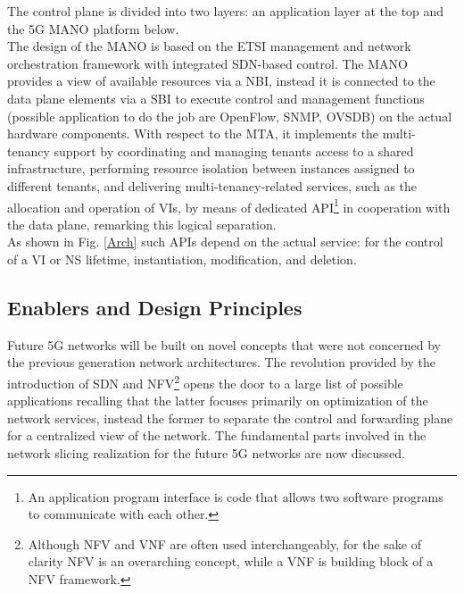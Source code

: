 \documentclass[a4paper,12pt]{report} %
\begin{document}
The control plane is divided into two layers: an application layer at the top and the 5G \gls{MANO} platform below. \\
The design of the MANO is based on the ETSI management and network orchestration framework with integrated SDN-based control. The MANO
provides a view of available resources  via a \gls{NBI}, instead it is connected to the data plane
elements via a \gls{SBI} to execute control and management
functions (possible application to do the job are OpenFlow, SNMP, OVSDB) on the actual hardware components.
With respect to the \gls{MTA}, it implements the
multi-tenancy support by coordinating and managing tenants access to a shared
infrastructure, performing resource isolation between instances assigned to
different tenants, and delivering multi-tenancy-related services, such as the
allocation and operation of VIs, by means of dedicated \gls{API}\footnote{An application program interface is code that allows two software programs to communicate with each other.} in cooperation
with the data plane, remarking this logical separation. \\
As shown in Fig. \ref{Arch}
such APIs depend on the actual service: for the control of a VI or NS lifetime,
instantiation, modification, and deletion.

\subsection{Enablers and Design Principles}
Future 5G networks will be built on novel concepts that were not concerned by the previous generation
network architectures. The revolution provided by the introduction of SDN
and \gls{NFV}\footnote{Although NFV and VNF are often used interchangeably, for the sake of clarity NFV is an overarching concept, while a VNF is building block of a NFV framework.} opens the door to a
large list of possible applications recalling that the latter focuses primarily on optimization of the network services, instead the former to separate the control and forwarding plane for a centralized view of the network. The fundamental parts involved in the network slicing realization for the future 5G networks are now discussed.
\end{document}
